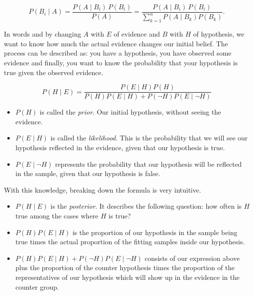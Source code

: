 \[
    P(B_i \mid A)
    = \frac{P(A \mid B_i)\,P(B_i)}{P(A)}
    = \frac{P(A \mid B_i)\,P(B_i)}{\sum_{k=1}^{n} P(A \mid B_k)P(B_k)}.
\]

In words and by changing \(A\) with \(E\) of evidence and \(B\) with \(H\) of hypothesis, we want to know how much the actual evidence changes 
our initial belief. The process can be described as: you have a hypothesis, you have observed some evidence and finally, you want to know 
the probability that your hypothesis is true given the observed evidence.

\[
    P(H \mid E) = \frac{P(E \mid H) P(H)}{P(H)P(E \mid H) + P(\neg H)P(E \mid \neg H)}
\]

\begin{itemize}
	
    \item \(P(H)\) is called the \emph{prior}. Our initial hypothesis, without seeing the evidence.

    \item \(P (E \mid H)\) is called the \emph{likelihood}. This is the probability that we will see our hypothesis reflected in the 
    evidence, given that our hypothesis is true.

    \item \(P (E \mid \neg H)\) represents the probability that our hypothesis will be reflected in the sample, given that our hypothesis is false. 
    
\end{itemize}

With this knowledge, breaking down the formula is very intuitive. 

\begin{itemize}
    
    \item \(P (H \mid E)\) is the \emph{posterior}. It describes the following question: how often is \(H\) true among the cases where \(H\) is true?

    \item \(P(H)P(E \mid H)\) is the proportion of our hypothesis in the sample being true times the actual proportion of the fitting samples inside our hypothesis. 

    \item \(P(H)P(E \mid H) + P(\neg H)P(E \mid \neg H) \) consists of our expression above plus the proportion of the counter hypothesis times the proportion of the 
    representatives of our hypothesis which will show up in the evidence in the counter group.

\end{itemize}

